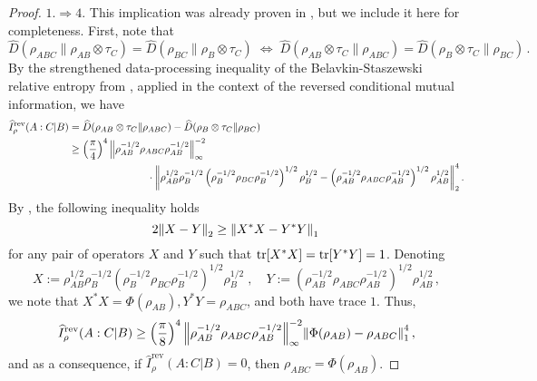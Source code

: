 \documentclass[11pt]{article}
\theoremstyle{newdefinition}
\theoremstyle{newplain}
\theoremstyle{myplain}
\DeclareMathOperator{\1}{\mathds{1}}
\begin{document}
{\begin{proof}
 \vspace{0.2cm}
     
\noindent  \underline{$1. \Rightarrow 4. $} This implication was already proven in \cite{gondolf2024conditional}, but we include it here for completeness. First, note that 
    \begin{equation}\label{eq:equivalent_equality_conditions_DPI}
        \widehat{D}(\rho_{ABC} \| \rho_{AB} \otimes \tau_C) =  \widehat{D}(\rho_{BC} \| \rho_{B} \otimes \tau_C) \; \Leftrightarrow \; \widehat{D}(\rho_{AB} \otimes \tau_C \| \rho_{ABC} ) =  \widehat{D}( \rho_{B} \otimes \tau_C \| \rho_{BC} ) \, .
    \end{equation}
     By the strengthened data-processing inequality of the Belavkin-Staszewski relative entropy from \cite{BluhmCapel-BSentropy-2019}, applied in the context of the reversed conditional mutual information, we have
     \begin{align}
         \widehat{I}^{\text{rev}}_\rho (A:C | B ) & = \widehat{D}(\rho_{AB} \otimes \tau_C \| \rho_{ABC} ) - \widehat{D}( \rho_{B} \otimes \tau_C \| \rho_{BC} ) \\
         & \geq \left( \frac{\pi}{4} \right)^4 \norm{ \rho_{AB}^{-1/2} \rho_{ABC} \rho_{AB}^{-1/2} }_\infty^{-2} \\
         & \hspace{2.7cm} \cdot \norm{ \rho^{1/2}_{AB} \rho^{-1/2}_{B} \left( \rho^{-1/2}_{B} \rho_{BC} \rho^{-1/2}_{B} \right)^{1/2}\rho^{1/2}_{B} - \left( \rho^{-1/2}_{AB} \rho_{ABC} \rho^{-1/2}_{AB} \right)^{1/2} \rho^{1/2}_{AB} }_2^4 \, .
     \end{align}
     By \cite[Lemma 2.2]{CarlenVershynina-Stability-DPI-RE-2017}, the following inequality holds
     \begin{equation}
         2 \norm{X-Y}_2 \geq \norm{X^* X - Y^* Y}_1 \, 
     \end{equation}
     for any pair of operators $X$ and $Y$ such that $\tr[X^* X] = \tr[Y^* Y]=1$. Denoting 
     \begin{equation}
         X:= \rho^{1/2}_{AB} \rho^{-1/2}_{B} \left( \rho^{-1/2}_{B} \rho_{BC} \rho^{-1/2}_{B} \right)^{1/2}\rho^{1/2}_{B} \; , \quad Y:= \left( \rho^{-1/2}_{AB} \rho_{ABC} \rho^{-1/2}_{AB} \right)^{1/2} \rho^{1/2}_{AB} \, ,
     \end{equation}
     we note that $X^*X = \Phi (\rho_{AB}), Y^* Y = \rho_{ABC}$, and both have trace $1$. Thus,  
     \begin{equation}
         \widehat{I}^{\text{rev}}_\rho (A:C | B )  \geq \left( \frac{\pi}{8} \right)^4 \norm{ \rho_{AB}^{-1/2} \rho_{ABC} \rho_{AB}^{-1/2} }_\infty^{-2}  \norm{ \Phi(\rho_{AB}) - \rho_{ABC}}^4_1 \, ,
     \end{equation}
     and as a consequence, if $\widehat{I}^{\text{rev}}_\rho (A:C | B ) = 0$, then  $ \rho_{ABC}= \Phi(\rho_{AB}) $. 


\end{proof}}
\end{document}
